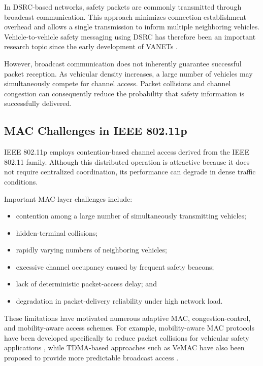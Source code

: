 In DSRC-based networks, safety packets are commonly transmitted through
broadcast communication. This approach minimizes connection-establishment
overhead and allows a single transmission to inform multiple neighboring
vehicles. Vehicle-to-vehicle safety messaging using DSRC has therefore been
an important research topic since the early development of VANETs
\cite{xu2004safety,jiang2006dsrc}.

However, broadcast communication does not inherently guarantee successful
packet reception. As vehicular density increases, a large number of vehicles
may simultaneously compete for channel access. Packet collisions and channel
congestion can consequently reduce the probability that safety information is
successfully delivered.

\subsection{MAC Challenges in IEEE 802.11p}

IEEE 802.11p employs contention-based channel access derived from the IEEE
802.11 family. Although this distributed operation is attractive because it
does not require centralized coordination, its performance can degrade in
dense traffic conditions.

Important MAC-layer challenges include:

\begin{itemize}
    \item contention among a large number of simultaneously transmitting
    vehicles;
    \item hidden-terminal collisions;
    \item rapidly varying numbers of neighboring vehicles;
    \item excessive channel occupancy caused by frequent safety beacons;
    \item lack of deterministic packet-access delay; and
    \item degradation in packet-delivery reliability under high network load.
\end{itemize}

These limitations have motivated numerous adaptive MAC, congestion-control,
and mobility-aware access schemes. For example, mobility-aware MAC protocols
have been developed specifically to reduce packet collisions for vehicular
safety applications \cite{lyu2018momac}, while TDMA-based approaches such as
VeMAC have also been proposed to provide more predictable broadcast access
\cite{omar2013vemac}.

